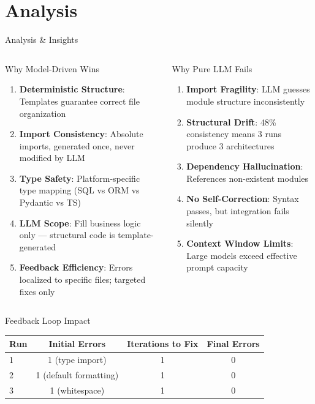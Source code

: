 \documentclass[10pt,aspectratio=169]{beamer}
\begin{document}
\section{Analysis}
\begin{frame}{Analysis \& Insights}
\vspace{-5pt}

\begin{columns}[T]
\begin{block}{Why Model-Driven Wins}
\begin{enumerate}
    \item \textbf{Deterministic Structure}: Templates guarantee correct file organization
    \item \textbf{Import Consistency}: Absolute imports, generated once, never modified by LLM
    \item \textbf{Type Safety}: Platform-specific type mapping (SQL vs ORM vs Pydantic vs TS)
    \item \textbf{LLM Scope}: Fill business logic only --- structural code is template-generated
    \item \textbf{Feedback Efficiency}: Errors localized to specific files; targeted fixes only
\end{enumerate}
\end{block}

\begin{block}{Why Pure LLM Fails}
\begin{enumerate}
    \item \textbf{Import Fragility}: LLM guesses module structure inconsistently
    \item \textbf{Structural Drift}: 48\% consistency means 3 runs produce 3 architectures
    \item \textbf{Dependency Hallucination}: References non-existent modules
    \item \textbf{No Self-Correction}: Syntax passes, but integration fails silently
    \item \textbf{Context Window Limits}: Large models exceed effective prompt capacity
\end{enumerate}
\end{block}
\end{columns}

\begin{block}{Feedback Loop Impact}
\setlength{\tabcolsep}{8pt}
\begin{center}
\begin{tabular}{lccc}
\toprule
\textbf{Run} & \textbf{Initial Errors} & \textbf{Iterations to Fix} & \textbf{Final Errors} \\
\midrule
1 & 1 (type import) & 1 & 0 \\
2 & 1 (default formatting) & 1 & 0 \\
3 & 1 (whitespace) & 1 & 0 \\
\bottomrule
\end{tabular}


\end{center}
\end{block}
\end{frame}
\end{document}
